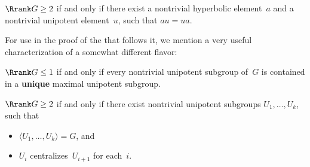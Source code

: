  \begin{prop}[\csee{Rrank2<>au=uaEx}] \label{Rrank2<>au=ua}
 $\Rrank G \ge 2$ if and only if there exist a nontrivial hyperbolic element~$a$ and
a nontrivial unipotent element~$u$, such that $au = ua$.
\end{prop}

For use in the proof of the  that follows it, we mention a very useful characterization of a somewhat different flavor:

\begin{lem} \label{Rrank1UniqMaxUnip}
$\Rrank G \le 1$ if and only if every nontrivial unipotent subgroup of~$G$ is contained in a \textbf{unique} maximal unipotent subgroup.
\end{lem}

\begin{prop} \label{Rrank2<>UnipGens}
$\Rrank G \ge 2$ if and only if there exist nontrivial unipotent subgroups $U_1,\ldots,U_k$, such that 
	\begin{itemize}
	\item $\langle U_1,\ldots,U_k \rangle = G$,
	and
	\item $U_i$ centralizes~$U_{i+1}$ for each~$i$.
	\end{itemize}
\end{prop}

